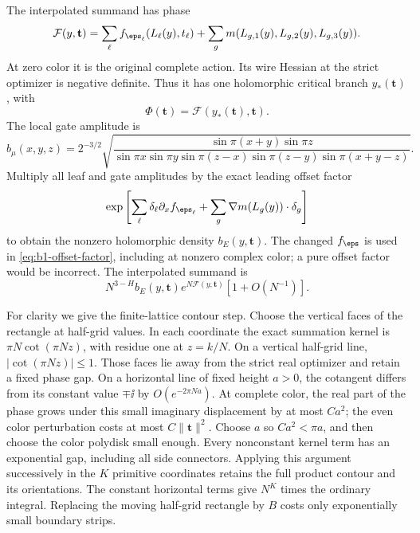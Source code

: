 The interpolated summand has phase
\begin{equation}\label{eq:b1-wire-phase}
 \mathcal F(y,\mathbf t)
 =\sum_{\ell}f_{\eps_\ell}(L_\ell(y),t_\ell)
  +\sum_g m(L_{g,1}(y),L_{g,2}(y),L_{g,3}(y)).
\end{equation}
At zero color it is the original complete action. Its wire Hessian at
the strict optimizer is negative definite. Thus it has one holomorphic
critical branch $y_*(\mathbf t)$, with
\[
 \Phi(\mathbf t)=\mathcal F(y_*(\mathbf t),\mathbf t).
\]
The local gate amplitude is
\[
 b_\mu(x,y,z)=2^{-3/2}
 \sqrt{\frac{\sin\pi(x+y)\sin\pi z}
 {\sin\pi x\sin\pi y\sin\pi(z-x)\sin\pi(z-y)\sin\pi(x+y-z)}}.
\]
Multiply all leaf and gate amplitudes by the exact leading offset factor
\begin{equation}\label{eq:b1-offset-factor}
 \exp\left[
  \sum_\ell\delta_\ell\partial_x f_{\eps_\ell}
  +\sum_g\nabla m(L_g(y))\mathbin{\cdot}\delta_g\right]
\end{equation}
to obtain the nonzero holomorphic density $b_E(y,\mathbf t)$.
The changed $f_\eps$ is used in \eqref{eq:b1-offset-factor}, including
at nonzero complex color; a pure offset factor would be incorrect.
The interpolated summand is
\[
 N^{3-H}b_E(y,\mathbf t)e^{N\mathcal F(y,\mathbf t)}
 [1+O(N^{-1})].
\]

For clarity we give the finite-lattice contour step. Choose the vertical
faces of the rectangle at half-grid values. In each coordinate the exact
summation kernel is $\pi N\cot(\pi Nz)$, with residue one at $z=k/N$.
On a vertical half-grid line, $|\cot(\pi Nz)|\le1$. Those faces lie
away from the strict real optimizer and retain a fixed phase gap.
On a horizontal line of fixed height $a>0$, the cotangent differs from
its constant value $\mp\ii$ by $O(e^{-2\pi Na})$. At complete color,
the real part of the phase grows under this small imaginary displacement
by at most $Ca^2$; the even color perturbation costs at most
$C\|\mathbf t\|^2$. Choose $a$ so $Ca^2<\pi a$, and then choose the
color polydisk small enough. Every nonconstant kernel term has an
exponential gap, including all side connectors. Applying this argument
successively in the $K$ primitive coordinates retains the full product
contour and its orientations. The constant horizontal terms give
$N^K$ times the ordinary integral. Replacing the moving half-grid
rectangle by $B$ costs only exponentially small boundary strips.

